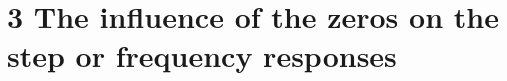\documentclass[a4paper,11pt]{article}
\begin{document}


\section*{3 The influence of the zeros on the step or frequency responses}


\clearpage

\end{document}
